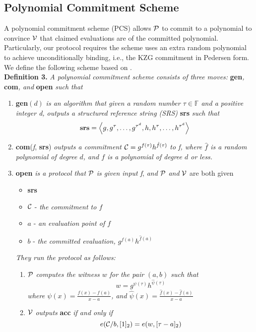\subsection{Polynomial Commitment Scheme}
A polynomial commitment scheme (PCS) allows $\mathcal{P}$ to commit to a polynomial to convince $\mathcal{V}$ that claimed evaluations are of the committed polynomial. Particularly, our protocol requires the scheme uses an extra random polynomial to achieve unconditionally binding, i.e., the KZG commitment in Pedersen form. We define the following scheme based on \cite{kzg,plonk,bdfg}. \\
\textbf{Definition 3.} \textit{A polynomial commitment scheme consists of three moves:} \textbf{gen}\textit{,} \textbf{com}\textit{, and} \textbf{open} \textit{such that}
\begin{enumerate}
    \item \textbf{gen}$(d)$ \textit{is an algorithm that given a random number $\tau\in\mathbb{F}$ and a positive integer d, outputs a structured reference string (SRS)} \textbf{srs} \textit{such that} 
    \[ \textbf{srs}=\left \langle g,g^\tau,\dots,g^{\tau^d},h,h^\tau,\dots,h^{\tau^d} \right \rangle \]
    \item \textbf{com}(\textit{f}, \textbf{srs}) \textit{outputs a commitment} $\mathcal{C}=g^{f(\tau)}h^{\hat{f}(\tau)}$ \textit{to f, where $\hat{f}$ is a random polynomial of degree $d$, and $f$ is a polynomial of degree $d$ or less.}
    \item \textbf{open} \textit{is a protocol that} $\mathcal{P}$ \textit{is given input f}, \textit{and} $\mathcal{P}$ \textit{and} $\mathcal{V}$ are both given
    \begin{itemize}
        \item \textbf{srs}
        \item $\mathcal{C}$ - \textit{the commitment to $f$}
        \item $a$ - \textit{an evaluation point of $f$}
        \item $b$ - \textit{the committed evaluation, $g^{f(a)}h^{\hat{f}(a)}$}
    \end{itemize}
    \textit{They run the protocol as follows:}
    \begin{enumerate}
        \item $\mathcal{P}$ \textit{computes the witness $w$ for the pair $(a,b)$ such that}
        \[ w=g^{\psi(\tau)}h^{\hat\psi(\tau)} \]
        \textit{where $\psi(x)=\frac{f(x)-f(a)}{x-a}$, and $\hat\psi(x)=\frac{\hat{f}(x)-\hat{f}(a)}{x-a}$}
        \item $\mathcal{V}$ \textit{outputs} \textbf{acc} \textit{if and only if}
        \[ e(\mathcal{C}/b,[1]_2)=e(w,[\tau-a]_2) \]
    \end{enumerate}
\end{enumerate}

